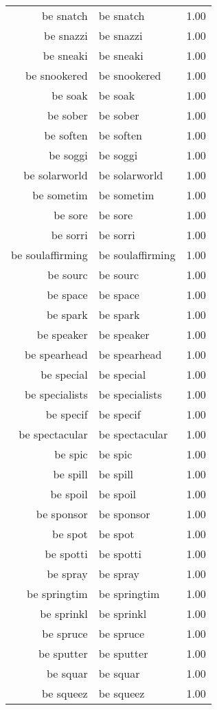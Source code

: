\begin{table}[ht]
\begin{tabular}{rlr}
  be snatch & be snatch & 1.00 \\ 
  be snazzi & be snazzi & 1.00 \\ 
  be sneaki & be sneaki & 1.00 \\ 
  be snookered & be snookered & 1.00 \\ 
  be soak & be soak & 1.00 \\ 
  be sober & be sober & 1.00 \\ 
  be soften & be soften & 1.00 \\ 
  be soggi & be soggi & 1.00 \\ 
  be solarworld & be solarworld & 1.00 \\ 
  be sometim & be sometim & 1.00 \\ 
  be sore & be sore & 1.00 \\ 
  be sorri & be sorri & 1.00 \\ 
  be soulaffirming & be soulaffirming & 1.00 \\ 
  be sourc & be sourc & 1.00 \\ 
  be space & be space & 1.00 \\ 
  be spark & be spark & 1.00 \\ 
  be speaker & be speaker & 1.00 \\ 
  be spearhead & be spearhead & 1.00 \\ 
  be special & be special & 1.00 \\ 
  be specialists & be specialists & 1.00 \\ 
  be specif & be specif & 1.00 \\ 
  be spectacular & be spectacular & 1.00 \\ 
  be spic & be spic & 1.00 \\ 
  be spill & be spill & 1.00 \\ 
  be spoil & be spoil & 1.00 \\ 
  be sponsor & be sponsor & 1.00 \\ 
  be spot & be spot & 1.00 \\ 
  be spotti & be spotti & 1.00 \\ 
  be spray & be spray & 1.00 \\ 
  be springtim & be springtim & 1.00 \\ 
  be sprinkl & be sprinkl & 1.00 \\ 
  be spruce & be spruce & 1.00 \\ 
  be sputter & be sputter & 1.00 \\ 
  be squar & be squar & 1.00 \\ 
  be squeez & be squeez & 1.00 \\ 

\end{tabular}
\end{table}
